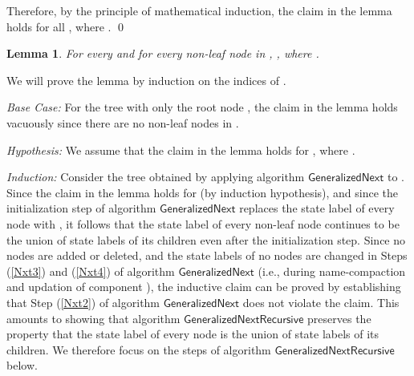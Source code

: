 \documentclass[3p]{elsarticle}
\newtheorem{lemma}[theorem]{Lemma}
\newcommand{\algo}[1]{\ensuremath{\textsf{{#1}}}}
\begin{document}
Therefore, by the principle of mathematical induction, the claim in
the lemma holds for all , where . \qed

\begin{lemma}
\label{lemmaC}
For every  and for every non-leaf node  in ,
, where .
\end{lemma}
We will prove the lemma by induction on the indices of .

\noindent \emph{Base Case:} For the tree  with only the root node
, the claim in the lemma holds vacuously since there are no
non-leaf nodes in .

\noindent \emph{Hypothesis:} We assume that the claim in the lemma
holds for , where .

\noindent \emph{Induction:} Consider the tree  obtained by
applying algorithm \algo{GeneralizedNext} to .  Since the claim
in the lemma holds for  (by induction hypothesis), and since the
initialization step of algorithm \algo{GeneralizedNext} replaces the
state label of every node  with , it
follows that the state label of every non-leaf node continues to be
the union of state labels of its children even after the
initialization step.  Since no nodes are added or deleted, and the
state labels of no nodes are changed in Steps (\ref{Nxt3}) and
(\ref{Nxt4}) of algorithm \algo{GeneralizedNext} (i.e., during
name-compaction and updation of component ), the inductive claim
can be proved by establishing that Step (\ref{Nxt2}) of algorithm
\algo{GeneralizedNext} does not violate the claim.  This amounts to
showing that algorithm \algo{GeneralizedNextRecursive} preserves the
property that the state label of every node is the union of state
labels of its children.  We therefore focus on the steps of algorithm
\algo{GeneralizedNextRecursive} below.
\end{document}
